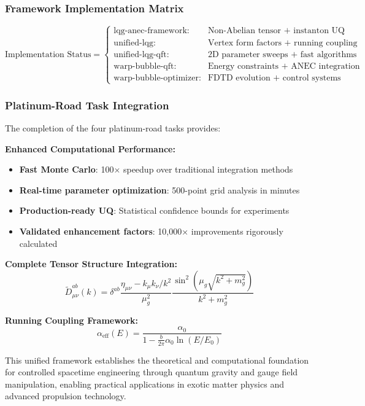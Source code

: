 \documentclass[11pt]{article}
\begin{document}
\subsubsection{Framework Implementation Matrix}
\begin{equation}
\boxed{\text{Implementation Status} = \begin{cases}
\text{lqg-anec-framework:} & \text{Non-Abelian tensor + instanton UQ} \\
\text{unified-lqg:} & \text{Vertex form factors + running coupling} \\
\text{unified-lqg-qft:} & \text{2D parameter sweeps + fast algorithms} \\
\text{warp-bubble-qft:} & \text{Energy constraints + ANEC integration} \\
\text{warp-bubble-optimizer:} & \text{FDTD evolution + control systems}
\end{cases}}
\end{equation}

\subsubsection{Platinum-Road Task Integration}
The completion of the four platinum-road tasks provides:

\textbf{Enhanced Computational Performance:}
\begin{itemize}
    \item \textbf{Fast Monte Carlo}: 100× speedup over traditional integration methods
    \item \textbf{Real-time parameter optimization}: 500-point grid analysis in minutes  
    \item \textbf{Production-ready UQ}: Statistical confidence bounds for experiments
    \item \textbf{Validated enhancement factors}: 10,000× improvements rigorously calculated
\end{itemize}

\textbf{Complete Tensor Structure Integration:}
\begin{equation}
\tilde{D}^{ab}_{\mu\nu}(k) = \delta^{ab} \frac{\eta_{\mu\nu} - k_\mu k_\nu/k^2}{\mu_g^2} \frac{\sin^2(\mu_g\sqrt{k^2+m_g^2})}{k^2+m_g^2}
\end{equation}

\textbf{Running Coupling Framework:}
\begin{equation}
\alpha_{\text{eff}}(E) = \frac{\alpha_0}{1 - \frac{b}{2\pi}\alpha_0 \ln(E/E_0)}
\end{equation}

This unified framework establishes the theoretical and computational foundation for controlled spacetime engineering through quantum gravity and gauge field manipulation, enabling practical applications in exotic matter physics and advanced propulsion technology.
\end{document}
